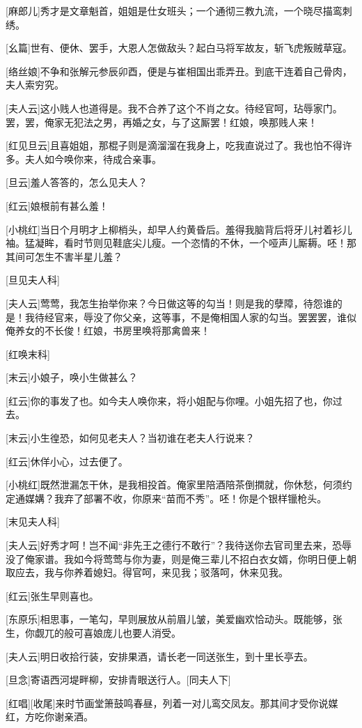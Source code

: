 \documentclass{book}
\begin{document}
[麻郎儿]秀才是文章魁首，姐姐是仕女班头；一个通彻三教九流，一个晓尽描鸾刺绣。

[幺篇]世有、便休、罢手，大恩人怎做敌头？起白马将军故友，斩飞虎叛贼草寇。

[络丝娘]不争和张解元参辰卯酉，便是与崔相国出乖弄丑。到底干连着自己骨肉，夫人索穷究。

[夫人云]这小贱人也道得是。我不合养了这个不肖之女。待经官呵，玷辱家门。罢，罢，俺家无犯法之男，再婚之女，与了这厮罢！红娘，唤那贱人来！

[红见旦云]且喜姐姐，那棍子则是滴溜溜在我身上，吃我直说过了。我也怕不得许多。夫人如今唤你来，待成合亲事。

[旦云]羞人答答的，怎么见夫人？

[红云]娘根前有甚么羞！

[小桃红]当日个月明才上柳梢头，却早人约黄昏后。羞得我脑背后将牙儿衬着衫儿袖。猛凝眸，看时节则见鞋底尖儿瘦。一个恣情的不休，一个哑声儿厮耨。呸！那其间可怎生不害半星儿羞？

[旦见夫人科]

[夫人云]莺莺，我怎生抬举你来？今日做这等的勾当！则是我的孽障，待怨谁的是！我待经官来，辱没了你父亲，这等事，不是俺相国人家的勾当。罢罢罢，谁似俺养女的不长俊！红娘，书房里唤将那禽兽来！

[红唤末科]

[末云]小娘子，唤小生做甚么？

[红云]你的事发了也。如今夫人唤你来，将小姐配与你哩。小姐先招了也，你过去。

[末云]小生徨恐，如何见老夫人？当初谁在老夫人行说来？

[红云]休佯小心，过去便了。

[小桃红]既然泄漏怎干休，是我相投首。俺家里陪酒陪茶倒撋就，你休愁，何须约定通媒媾？我弃了部署不收，你原来``苗而不秀''。呸！你是个银样镴枪头。

[末见夫人科]

[夫人云]好秀才呵！岂不闻``非先王之德行不敢行''？我待送你去官司里去来，恐辱没了俺家谱。我如今将莺莺与你为妻，则是俺三辈儿不招白衣女婿，你明日便上朝取应去，我与你养着媳妇。得官呵，来见我；驳落呵，休来见我。

[红云]张生早则喜也。

[东原乐]相思事，一笔勾，早则展放从前眉儿皱，美爱幽欢恰动头。既能够，张生，你觑兀的般可喜娘庞儿也要人消受。

[夫人云]明日收拾行装，安排果酒，请长老一同送张生，到十里长亭去。

[旦念]寄语西河堤畔柳，安排青眼送行人。[同夫人下]

[红唱][收尾]来时节画堂箫鼓鸣春昼，列着一对儿鸾交凤友。那其间才受你说媒红，方吃你谢亲酒。
\end{document}
